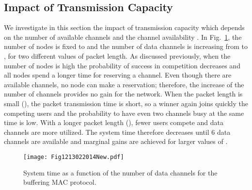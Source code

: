 \documentclass[12pt,journal,oneside,onecolumn]{IEEEtran}
\begin{document}
\subsection{Impact of Transmission Capacity}
\label{sec:res_tx_cap}

We investigate in this section the impact of transmission capacity which depends on the number of available
channels and the channel availability .
In Fig.~\ref{Fig010203112013}, the number of nodes is fixed 
to  and the number of data channels is increasing 
from  to , for two different values of packet length. 
As discussed previously, when the number of nodes is high the probability of success in competition decreases and
all nodes spend a longer time for reserving a channel. Even though there 
are available channels, no node can make a reservation; 
therefore, the increase of the number of channels provides no 
gain for the network. When the packet length is small (), 
the packet transmission time is short, so a winner again joins quickly 
the competing users and the probability to have even two channels 
busy at the same time is low.  
With a longer packet length (), fewer users compete and data channels are more utilized. The
system time therefore decreases until 6 data channels are available and marginal gains are achieved
for larger values of .
\begin{figure}\texttt{[image: Fig1213022014New.pdf]}\caption{System time as a function of the number of data channels  for the buffering MAC protocol.}\label{Fig010203112013}\end{figure}
\end{document}
